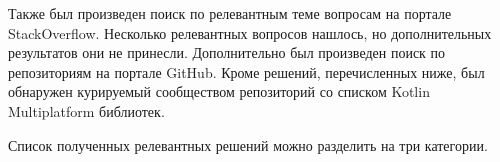     Также был произведен поиск по релевантным теме вопросам на портале StackOverflow\cite{stackoverflow}. Несколько релевантных вопросов нашлось\cite{so-file-io-with-kotlin-multiplatform,so-read-write-file-in-kotlin-native-ios-side}, но дополнительных результатов они не принесли.
    Дополнительно был произведен поиск по репозиториям на портале GitHub\cite{github}. Кроме решений, перечисленных ниже, был обнаружен курируемый сообществом репозиторий со списком Kotlin Multiplatform библиотек\cite{gh-kotlin-multiplatform-libs}.

    Список полученных релевантных решений можно разделить на три категории.

    \newcommand{\existingsolution}[3]{\item \textbf{#1}#2\par#3}


